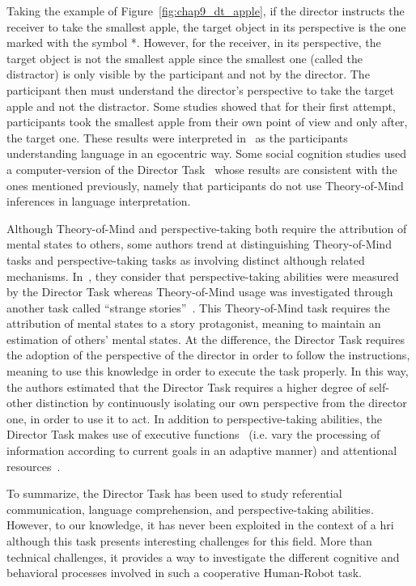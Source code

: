 Taking the example of Figure~\ref{fig:chap9_dt_apple}, if the director instructs the receiver to take the smallest apple, the target object in its perspective is the one marked with the symbol *. However, for the receiver, in its perspective, the target object is not the smallest apple since the smallest one (called the distractor) is only visible by the participant and not by the director. The participant then must understand the director's perspective to take the target apple and not the distractor. Some studies showed that for their first attempt, participants took the smallest apple from their own point of view and only after, the target one. These results were interpreted in~\cite{keysar_1994_illusory, keysar_1998_egocentric, keysar_2002_self, keysar_2003_limits} as the participants understanding language in an egocentric way. Some social cognition studies used a computer-version of the Director Task~\cite{dumontheil_2010_online} whose results are consistent with the ones mentioned previously, namely that participants do not use Theory-of-Mind inferences in language interpretation.

Although Theory-of-Mind and perspective-taking both require the attribution of mental states to others, some authors trend at distinguishing Theory-of-Mind tasks and perspective-taking tasks as involving distinct although related mechanisms. In~\cite{santiesteban_2012_training}, they consider that perspective-taking abilities were measured by the Director Task whereas Theory-of-Mind usage was investigated through another task called ``strange stories''~\cite{happe_1994_advanced}. This Theory-of-Mind task requires the attribution of mental states to a story protagonist, meaning to maintain an estimation of others' mental states. At the difference, the Director Task requires the adoption of the perspective of the director in order to follow the instructions, meaning to use this knowledge in order to execute the task properly. 
In this way, the authors estimated that the Director Task requires a higher degree of self-other distinction by continuously isolating our own perspective from the director one, in order to use it to act. In addition to perspective-taking abilities, the Director Task makes use of executive functions~\cite{rubio_2017_director} (i.e. vary the processing of information according to current goals in an adaptive manner) and attentional resources~\cite{lin_2010_reflexively}.

\newpage

To summarize, the Director Task has been used to study referential communication, language comprehension, and perspective-taking abilities. However, to our knowledge, it has never been exploited in the context of a \acrshort{hri} although this task presents interesting challenges for this field. More than technical challenges, it provides a way to investigate the different cognitive and behavioral processes involved in such a cooperative Human-Robot task.

